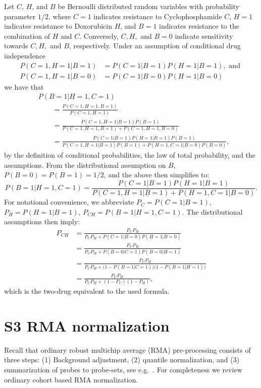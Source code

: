 \documentclass{article}
\begin{document}
Let $C$, $H$, and $B$ be Bernoulli distributed random variables with probability parameter $1/2$, where
$C = 1$ indicates resistance to Cyclophosphamide $C$,
$H = 1$ indicates resistance to Doxorubicin $H$, and
$B = 1$ indicates resistance to the combination of $H$ and $C$.
Conversely, $C,H,$ and $B = 0$ indicate sensitivity towards $C,H,$ and $B$, respectively.
Under an assumption of conditional drug independence
\begin{align*}
  P(C=1, H=1| B=1) &= P(C=1 | B=1) P(H=1 | B=1), \text{ and } \\
  P(C=1, H=1| B=0) &= P(C=1 | B=0) P(H=1 | B=0)
\end{align*}
we have that
\begin{align*}
  &P(B=1 | H=1, C=1)
  \\&\qquad
   = \frac{P(C=1, H=1, B=1)}
          {P(C=1, H=1)}
  \\&\qquad
   = \frac{P(C=1, H=1 | B=1) P(B=1)}
          {P(C=1, H=1, B=1) + P(C=1, H=1, B=0)}
  \\&\qquad
   = \frac{P(C=1 | B=1) P(H=1 | B=1) P(B=1)}
          {P(C=1, H=1 | B=1) P(B=1) + P(H=1, C=1| B=0) P(B=0)},
\end{align*}
by the definition of conditional probabilities, the law of total probability, and the assumptions.
From the distributional assumption on $B$, $P(B=0) = P(B=1) = 1/2$, and the above then simplifies to:
\begin{equation*}
  P(B=1 | H=1, C=1)
   = \frac{P(C=1 | B=1) P(H=1 | B=1)}
          {P(C=1, H=1 | B=1) + P(H=1, C=1 | B=0)}.
\end{equation*}
For notational convenience, we abbreviate
$P_C = P(C=1 | B=1)$,
$P_H = P(H=1 | B=1)$,
$P_{CH} = P(B=1 | H=1, C=1)$.
The distributional assumptions then imply:
\begin{align*}
  P_{CH}
  &= \frac{P_C P_H}
          {P_C P_H + P(C=1 | B=0) P(H=1 | B=0)}
  \\
  &= \frac{P_C P_H}
          {P_C P_H + P(B=0 | C=1) P(B=0 | H=1)}
  \\
  &= \frac{P_C P_H}
          {P_C P_H + \bigl(1 - P(B=1 | C=1)\bigr)\bigl(1 - P(B=1 | H=1)\bigr)}
  \\
  &= \frac{P_C P_H}
          {P_C P_H + (1 - P_C)(1 - P_H)},
\end{align*}
which is the two-drug equivalent to the used formula.




\section*{S3 RMA normalization} \label{supprma}
Recall that ordinary robust multichip average (RMA) pre-processing consists of three steps: (1) Background adjustment, (2) quantile normalization, and (3) summarization of probes to probe-sets, see e.g.\ \citep{Irizarry2003, Irizarry2003b}. For completeness we review ordinary cohort based RMA normalization.
\end{document}
